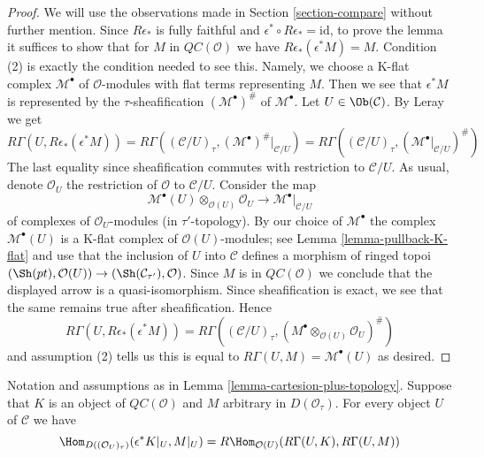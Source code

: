 \begin{proof}
We will use the observations made in Section \ref{section-compare} without
further mention. Since $R\epsilon_*$
is fully faithful and $\epsilon^* \circ R\epsilon_* = \text{id}$,
to prove the lemma it suffices to show that for $M$ in
$\mathit{QC}(\mathcal{O})$ we have $R\epsilon_*(\epsilon^*M) = M$.
Condition (2) is exactly the condition needed to see this.
Namely, we choose a K-flat complex $\mathcal{M}^\bullet$
of $\mathcal{O}$-modules with flat terms representing $M$.
Then we see that $\epsilon^*M$ is represented by the $\tau$-sheafification
$(\mathcal{M}^\bullet)^\#$ of $\mathcal{M}^\bullet$.
Let $U \in \Ob(\mathcal{C})$. By Leray we get
$$
R\Gamma(U, R\epsilon_*(\epsilon^*M)) =
R\Gamma((\mathcal{C}/U)_\tau, (\mathcal{M}^\bullet)^\#|_{\mathcal{C}/U}) =
R\Gamma((\mathcal{C}/U)_\tau, (\mathcal{M}^\bullet|_{\mathcal{C}/U})^\#)
$$
The last equality since
sheafification commutes with restriction to $\mathcal{C}/U$.
As usual, denote $\mathcal{O}_U$ the restriction of $\mathcal{O}$ to
$\mathcal{C}/U$. Consider the map
$$
\mathcal{M}^\bullet(U) \otimes_{\mathcal{O}(U)} \mathcal{O}_U
\longrightarrow
\mathcal{M}^\bullet|_{\mathcal{C}/U}
$$
of complexes of $\mathcal{O}_U$-modules (in $\tau'$-topology).
By our choice of $\mathcal{M}^\bullet$ the complex $\mathcal{M}^\bullet(U)$
is a K-flat complex of $\mathcal{O}(U)$-modules; see
Lemma \ref{lemma-pullback-K-flat} and use that the inclusion
of $U$ into $\mathcal{C}$ defines a morphism of ringed topoi
$(\Sh(pt), \mathcal{O}(U)) \to (\Sh(\mathcal{C}_{\tau'}), \mathcal{O})$.
Since $M$ is in $\mathit{QC}(\mathcal{O})$ we conclude that
the displayed arrow is a quasi-isomorphism. Since sheafification
is exact, we see that the same remains true after sheafification.
Hence
$$
R\Gamma(U, R\epsilon_*(\epsilon^*M)) =
R\Gamma((\mathcal{C}/U)_\tau,
(M^\bullet \otimes_{\mathcal{O}(U)} \mathcal{O}_U)^\#)
$$
and assumption (2) tells us this is equal to
$R\Gamma(U, M) = \mathcal{M}^\bullet(U)$ as desired.
\end{proof}

\begin{lemma}
\label{lemma-QC-hom-out-of-plus-topology}
Notation and assumptions as in Lemma \ref{lemma-cartesion-plus-topology}.
Suppose that $K$ is an object of
$\mathit{QC}(\mathcal{O})$ and $M$ arbitrary in $D(\mathcal{O}_\tau)$.
For every object $U$ of $\mathcal{C}$ we have
$$
\Hom_{D((\mathcal{O}_U)_\tau)}(\epsilon^*K|_U, M|_U) =
R\Hom_{\mathcal{O}(U)}(R\Gamma(U, K), R\Gamma(U, M))
$$
\end{lemma}


